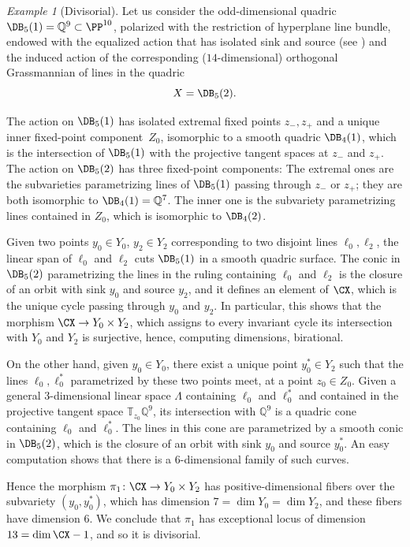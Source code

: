 \documentclass[11pt]{amsart}
\numberwithin{equation}{section}
\theoremstyle{definition}
\theoremstyle{remark}
\newtheorem{example}[theorem]{Example}
\begin{document}
\begin{example}[Divisorial]\label{ex:div}
  Let us consider the odd-dimensional quadric $\DB_{5}(1)=\mathbb Q^{9} \subset \PP^{10}$, polarized with the restriction of hyperplane line bundle, endowed with the equalized action that has isolated sink and source (see \cite[Section~3.2]{FS}) and the induced action of the corresponding ($14$-dimensional) orthogonal Grassmannian of lines in the quadric
\[X=\DB_5(2).\]

The action on $\DB_{5}(1)$ has isolated extremal fixed points $z_-,z_+$ and a unique inner fixed-point component~$Z_0$, isomorphic to a smooth quadric $\DB_{4}(1)$, which is the intersection of $\DB_5(1)$ with the projective tangent spaces at $z_-$ and $z_+$. The action on $\DB_{5}(2)$ has three fixed-point components: The extremal ones are the subvarieties parametrizing lines of $\DB_5(1)$ passing through $z_-$ or $z_+$; they are both isomorphic to $\DB_{4}(1)=\mathbb Q^{7}$. The inner one is the subvariety parametrizing lines contained in $Z_0$, which is isomorphic to $\DB_{4}(2)$.

Given two points $y_0 \in Y_0$, $y_2 \in Y_2$ corresponding to two disjoint lines $\ell_0,\ell_2$, the linear span of $\ell_0$ and $\ell_2$ cuts $\DB_{5}(1)$ in a smooth quadric surface. The conic in $\DB_5(2)$ parametrizing the lines in the ruling containing $\ell_0$ and $\ell_2$ is the closure of an orbit with sink $y_0$ and source $y_2$, and it defines an element of $\CX$, which is the unique cycle passing through $y_0$ and $y_2$. In particular, this shows that the morphism $\CX \to Y_0 \times Y_2$, which assigns to every invariant cycle its intersection with $Y_0$ and $Y_2$ is surjective, hence, computing dimensions, birational.

On the other hand, given $y_0 \in Y_0$, there exist a unique point $y_0^*\in Y_2$ such that the lines $\ell_0,\ell_0^*$ parametrized by these two points meet, at a point $z_0 \in Z_0$. Given a general $3$-dimensional linear space $\Lambda$ containing $\ell_0$ and $\ell_0^*$ and contained in the projective tangent space $\mathbb T_{z_0}\mathbb Q^{9}$, its intersection with $\mathbb Q^{9}$ is a quadric cone containing $\ell_0$ and $\ell_0^*$. The lines in this cone are parametrized by a smooth conic in $\DB_{5}(2)$, which is the closure of an orbit with sink $y_0$ and source $y_0^*$. An easy computation shows that there is a $6$-dimensional family of such curves.

Hence the morphism $\pi_1\colon \CX \to Y_0 \times Y_2$ has positive-dimensional fibers over the subvariety $(y_0,y_0^*)$, which has dimension $7 = \dim Y_0=\dim Y_2$, and these fibers have  dimension $6$. We conclude that $\pi_1$ has exceptional locus of dimension $13= \dim \CX -1$, and so it is divisorial. 
\end{example}
\end{document}
